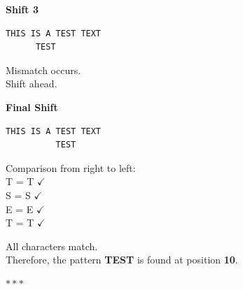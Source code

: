 \begin{enumerate}[label=\textbf{\Alph*.}]
\textbf{Shift 3}

\begin{verbatim}
THIS IS A TEST TEXT
      TEST
\end{verbatim}

Mismatch occurs.\\
Shift ahead.

\textbf{Final Shift}

\begin{verbatim}
THIS IS A TEST TEXT
          TEST
\end{verbatim}

Comparison from right to left:\\
T = T $\checkmark$\\
S = S $\checkmark$\\
E = E $\checkmark$\\
T = T $\checkmark$

All characters match.\\
Therefore, the pattern \textbf{TEST} is found at position \textbf{10}.

\end{enumerate}

\begin{center}
\vspace{1cm}
$\ast \ast \ast$
\end{center}
\newpage
